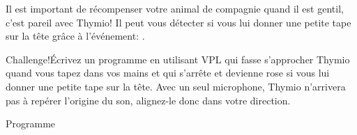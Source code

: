 
Il est important de récompenser votre animal de compagnie quand il est gentil, c'est pareil avec Thymio! Il peut vous détecter si vous lui donner une petite tape sur la tête grâce à  l'événement: . 

\begin{bclogo}[couleur = pink!30, arrondi = 0.1, logo = \bccrayon, ombre = true]{Challenge!}Écrivez un programme en utilisant VPL qui fasse s'approcher Thymio quand vous tapez dans vos mains et qui s'arrête et devienne rose si vous lui donner une petite tape sur la tête. Avec un seul microphone, Thymio n'arrivera pas à repérer l'origine du son, alignez-le donc dans votre direction.
\end{bclogo}

{\raggedleft \hfill Programme }